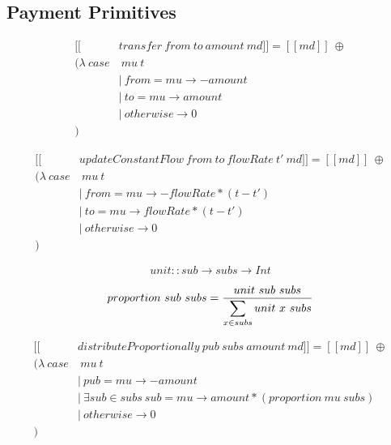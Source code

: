 \documentclass[a4paper,10pt]{report}
\begin{document}
\subsection{Payment Primitives}

\begin{equation}\label{sem_transfer}
    \begin{split}
        [\![&transfer\ from\ to\ amount\ md]\!] = [\![md]\!]\ \oplus \\
        (\lambda\ case&\ mu\ t \\
        &|\ from = mu \rightarrow -amount \\
        &|\ to   = mu \rightarrow amount \\
        &|\ otherwise \rightarrow 0 \\
        )
    \end{split}
\end{equation}

\begin{equation}\label{sem_updateConstantFlow}
    \begin{split}
        [\![&updateConstantFlow\ from\ to\ flowRate\ t'\ md]\!] = [\![md]\!]\ \oplus \\
        (\lambda\ case&\ mu\ t \\
        &|\ from = mu \rightarrow -flowRate * (t - t') \\
        &|\ to   = mu \rightarrow flowRate  * (t - t') \\
        &|\ otherwise \rightarrow 0 \\
        )
    \end{split}
\end{equation}

\begin{equation}
    unit :: sub \rightarrow subs \rightarrow Int
\end{equation}

\begin{equation}
    proportion\ sub\ subs = {{ unit\ sub\ subs } \over { \displaystyle \sum_{x \in subs} unit\ x\ subs }}
\end{equation}

\begin{equation}\label{sem_distributeProportionally}
    \begin{split}
        [\![&distributeProportionally\ pub\ subs\ amount\ md]\!] = [\![md]\!]\ \oplus \\
        (\lambda\ case&\ mu\ t \\
        &|\ pub = mu \rightarrow -amount \\
        &|\ \exists sub \in subs\ { sub = mu } \rightarrow amount * (proportion\ mu\ subs) \\
        &|\ otherwise \rightarrow 0 \\
        )
    \end{split}
\end{equation}
\end{document}
